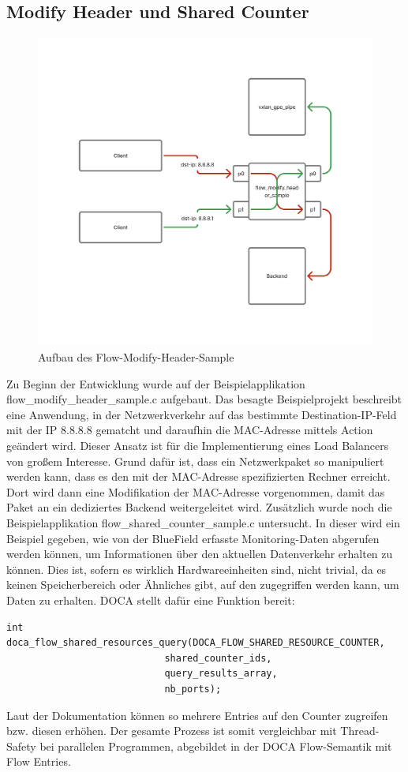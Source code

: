 \subsection{Modify Header und Shared Counter}
\begin{figure}
    \centering
    \includegraphics[width=0.8\linewidth]{images/modify_header.png}
    \caption{Aufbau des Flow-Modify-Header-Sample}
    \label{fig:enter-label}
\end{figure}
Zu Beginn der Entwicklung wurde auf der Beispielapplikation flow\_modify\_header\_sample.c aufgebaut. Das besagte Beispielprojekt beschreibt eine Anwendung, in der Netzwerkverkehr auf das bestimmte Destination-IP-Feld mit der IP 8.8.8.8 gematcht und daraufhin die MAC-Adresse mittels Action geändert wird. Dieser Ansatz ist für die Implementierung eines Load Balancers von großem Interesse. Grund dafür ist, dass ein Netzwerkpaket so manipuliert werden kann, dass es den mit der MAC-Adresse spezifizierten Rechner erreicht. Dort wird dann eine Modifikation der MAC-Adresse vorgenommen, damit das Paket an ein dediziertes Backend weitergeleitet wird. Zusätzlich wurde noch die Beispielapplikation flow\_shared\_counter\_sample.c untersucht. In dieser wird ein Beispiel gegeben, wie von der BlueField erfasste Monitoring-Daten abgerufen werden können, um Informationen über den aktuellen Datenverkehr erhalten zu können. Dies ist, sofern es wirklich Hardwareeinheiten sind, nicht trivial, da es keinen Speicherbereich oder Ähnliches gibt, auf den zugegriffen werden kann, um Daten zu erhalten. DOCA stellt dafür eine Funktion bereit:
\begin{verbatim}
int doca_flow_shared_resources_query(DOCA_FLOW_SHARED_RESOURCE_COUNTER,
							shared_counter_ids,
							query_results_array,
							nb_ports);
\end{verbatim}
 Laut der Dokumentation können so mehrere Entries auf den Counter zugreifen bzw. diesen erhöhen. Der gesamte Prozess ist somit vergleichbar mit Thread-Safety bei parallelen Programmen, abgebildet in der DOCA Flow-Semantik mit Flow Entries.

